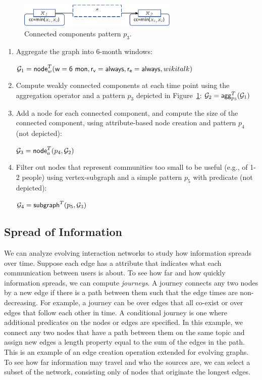 \begin{figure}
\centering
\includegraphics[width=3in]{figs/ccp.pdf}
\caption{Connected components pattern $p_3$.}
\vspace{-0.2cm}
\label{fig:ccp}
\vspace{-0.2cm}
\end{figure}

\begin{enumerate}[itemindent=\dimexpr\labelwidth+\labelsep\relax,leftmargin=0pt]
\item Aggregate the graph into 6-month windows:

$\mathcal{G}_1 = \textsf{node}^T_w(\mathsf{w=6~mon},\mathsf{r_v=always},\mathsf{r_e=always},wikitalk)$

\item Compute weakly connected components at each time point using the aggregation operator and a pattern $p_3$ depicted in Figure~\ref{fig:ccp}:  $\mathcal{G}_2 = \textsf{agg}^T_{p_3}(\mathcal{G}_1)$

\item Add a node for each connected component, and compute the size of
  the connected component, using attribute-based node creation and
  pattern $p_4$ (not depicted): 

$\mathcal{G}_3 =
  \textsf{node}^T_a(p_4,\mathcal{G}_2)$

\item Filter out nodes that represent communities too small to be
  useful (e.g., of 1-2 people) using vertex-subgraph and a simple
  pattern $p_5$ with  predicate (not depicted): 

$\mathcal{G}_4 = \textsf{subgraph}^T(p_5,\mathcal{G}_3)$
\end{enumerate}

\subsection{ Spread of Information} 

We can analyze evolving interaction networks to study how information
spreads over time.  Suppose each edge has a  attribute
that indicates what each communication between users is about.  To see
how far and how quickly information spreads, we can compute {\em
journeys}.  A journey connects any two nodes by a new edge if there is
a path between them such that the edge times are non-decreasing.  For
example, a journey can be over edges that all co-exist or over edges
that follow each other in time.  A conditional journey is one where
additional predicates on the nodes or edges are specified.  In this
example, we connect any two nodes that have a path between them on the
same topic and assign new edges a length property equal to the sum of
the edges in the path.  This is an example of an edge creation
operation extended for evolving graphs.  To see how far information
may travel and who the sources are, we can select a subset of the
network, consisting only of nodes that originate the longest edges.

